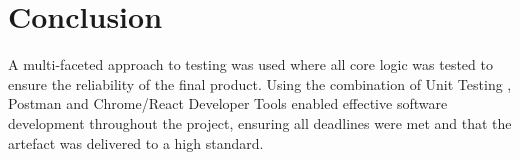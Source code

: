 \section{Conclusion}
\label{testing:conclusion}

A multi-faceted approach to testing was used where all core logic was tested to ensure the reliability of the final product. Using the combination of Unit Testing , Postman  and Chrome/React Developer Tools  enabled effective software development throughout the project, ensuring all deadlines were met and that the artefact was delivered to a high standard.